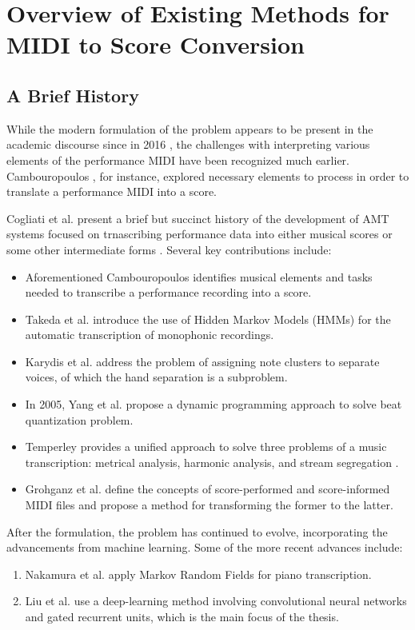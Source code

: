 \chapter{Overview of Existing Methods for MIDI to Score Conversion}

\section{A Brief History}

While the modern formulation of the problem appears to be present in the academic discourse since in 2016 \cite{Cogliati2016}, the challenges with interpreting various elements of the performance MIDI have been recognized much earlier. Cambouropoulos \cite{Cambouropoulos2000}, for instance, explored necessary elements to process in order to translate a performance MIDI into a score.

Cogliati et al. present a brief but succinct history of the development of AMT systems focused on trnascribing performance data into either musical scores or some other intermediate forms \cite{Cogliati2016}. Several key contributions include:
\begin{itemize}
	\item Aforementioned Cambouropoulos \cite{Cambouropoulos2000} identifies musical elements and tasks needed to transcribe a performance recording into a score.
	\item Takeda et al. \cite{Takeda2002} introduce the use of Hidden Markov Models (HMMs) for the automatic transcription of monophonic recordings.
	\item Karydis et al. \cite{Karydis2007} address the problem of assigning note clusters to separate voices, of which the hand separation is a subproblem.
	\item In 2005, Yang et al. \cite{Yang2005} propose a dynamic programming approach to solve beat quantization problem.
	\item Temperley provides a unified approach to solve three problems of a music transcription: metrical analysis, harmonic analysis, and stream segregation \cite{Temperley2009}.
	\item Grohganz et al. \cite{Grohganz2014} define the concepts of score-performed and score-informed MIDI files and propose a method for transforming the former to the latter.
\end{itemize}

After the formulation, the problem has continued to evolve, incorporating the advancements from machine learning. Some of the more recent advances include:
\begin{enumerate}
	\item Nakamura et al. \cite{Nakamura2017a} apply Markov Random Fields for piano transcription.
	\item Liu et al. \cite{Liu2022} use a deep-learning method involving convolutional neural networks and gated recurrent units, which is the main focus of the thesis.
\end{enumerate}

